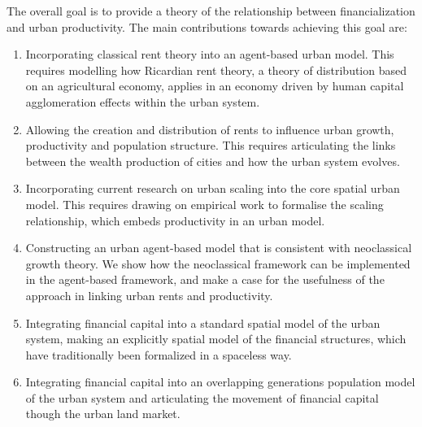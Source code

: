 The overall goal is to provide a theory of the relationship between financialization and urban productivity. The main contributions towards achieving this goal are:
\begin{enumerate}
    \item  Incorporating \gls{classical rent theory} into an \gls{agent-based} urban model. This requires modelling how \gls{Ricardian rent theory}, a theory of distribution based on an agricultural economy, applies %
in an economy driven by human capital \gls{agglomeration} effects within the urban system. 

    \item Allowing the creation and distribution of rents to influence urban growth, productivity and  population structure. This requires articulating the links between the wealth production of cities and how the urban system evolves.

    \item Incorporating current research on \gls{urban scaling} into the core spatial urban model.  This requires drawing on empirical work to formalise the scaling relationship, which embeds productivity in an urban model. %

    \item Constructing an urban \gls{agent-based model} that is consistent with {neoclassical growth theory}. We show how the neoclassical framework can be implemented in the agent-based framework, and make a case for the usefulness of the approach in linking urban rents and productivity. %

    \item Integrating \gls{financial capital} into a standard spatial model of the urban system, making an explicitly spatial model of the financial structures, which have traditionally been formalized in a spaceless way.
    
    \item Integrating financial capital into an \gls{overlapping generations} population model of the urban system and %
articulating the movement of financial capital though the urban land market. 
    

\end{enumerate}
